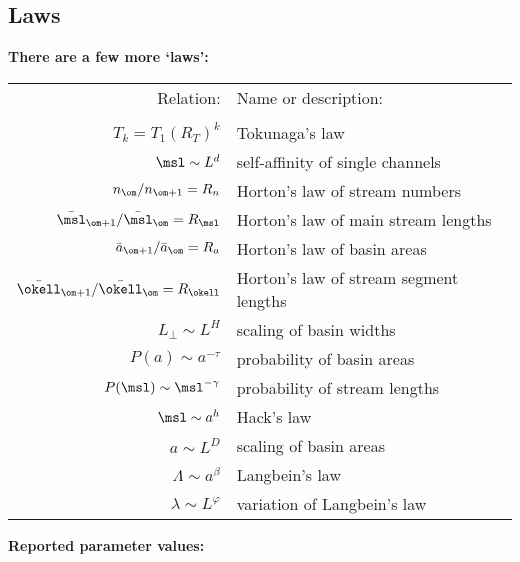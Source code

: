 \begin{frame}[label=]
\begin{frame}[label=]
\begin{frame}[label=]
\begin{frame}[label=]
\begin{frame}[label=]
\begin{frame}[label=]
\begin{frame}[label=]
\begin{frame}[label=]
\subsection{Laws}

\begin{frame}[label=]
  \textbf{There are a few more `laws':\cite{dodds1999a}}

  \begin{tabular}{rl}
    \alert{Relation:} & \alert{Name or description:}  \\
    & \\
    $T_{k} = T_1 (R_T)^{k}$ & {Tokunaga's law}  \\
    $\msl \sim L^{{d}}$ & {self-affinity of single channels}  \\
    $n_{\om}/n_{\om+1} = R_n$ & Horton's law of stream numbers  \\
    $\bar{\msl}_{\om+1}/\bar{\msl}_{\om} = R_{\msl}$ & Horton's law 
    of main stream lengths \\
    $\bar{a}_{\om+1}/\bar{a}_{\om} = R_a$ & Horton's law of basin areas \\
    $\bar{\okell}_{\om+1}/\bar{\okell}_{\om} = R_{\okell}$ & Horton's law 
    of stream segment lengths  \\
    $L_\perp \sim L^H$ & scaling of basin widths \\
    $P(a) \sim a^{-\tau}$ & probability of basin areas \\
    $P(\msl)\sim \msl^{-\gamma}$ & probability of stream lengths \\
    $\msl \sim a^h$ & Hack's law \\
    $a \sim L^D$ & scaling of basin areas \\
    $\Lambda \sim a^\beta$ & Langbein's law \\
    $\lambda \sim L^\varphi$ & variation of Langbein's law\\
  \end{tabular}


\begin{frame}[label=]
  \textbf{Reported parameter values:\cite{dodds1999a}}


\end{frame}
\end{frame}
\end{frame}
\end{frame}
\end{frame}
\end{frame}
\end{frame}
\end{frame}
\end{frame}
\end{frame}
